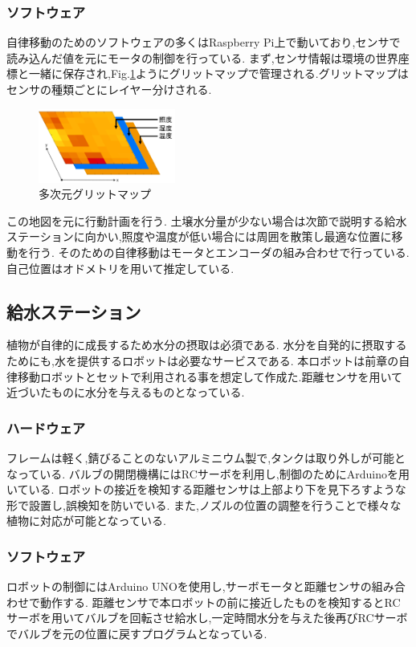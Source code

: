 \documentclass[10pt]{jsarticle}
\begin{document}
\subsubsection{ソフトウェア}
自律移動のためのソフトウェアの多くはRaspberry Pi上で動いており,センサで読み込んだ値を元にモータの制御を行っている.
まず,センサ情報は環境の世界座標と一緒に保存され,Fig.\ref{map}ようにグリットマップで管理される.グリットマップはセンサの種類ごとにレイヤー分けされる.
\begin{figure}[t]
    \centering
    \includegraphics[width=0.4\textwidth]{img/map_setumei.png}
    \caption{多次元グリットマップ}
    \label{map}
\end{figure}
この地図を元に行動計画を行う.
土壌水分量が少ない場合は次節で説明する給水ステーションに向かい,照度や温度が低い場合には周囲を散策し最適な位置に移動を行う.
そのための自律移動はモータとエンコーダの組み合わせで行っている.
自己位置はオドメトリを用いて推定している.

\subsection{給水ステーション}
植物が自律的に成長するため水分の摂取は必須である.
水分を自発的に摂取するためにも,水を提供するロボットは必要なサービスである.
本ロボットは前章の自律移動ロボットとセットで利用される事を想定して作成た.距離センサを用いて近づいたものに水分を与えるものとなっている.
\subsubsection{ハードウェア}
フレームは軽く,錆びることのないアルミニウム製で,タンクは取り外しが可能となっている.
バルブの開閉機構にはRCサーボを利用し,制御のためにArduinoを用いている.
ロボットの接近を検知する距離センサは上部より下を見下ろすような形で設置し,誤検知を防いでいる.
また,ノズルの位置の調整を行うことで様々な植物に対応が可能となっている.
\subsubsection{ソフトウェア}
ロボットの制御にはArduino UNOを使用し,サーボモータと距離センサの組み合わせで動作する.
距離センサで本ロボットの前に接近したものを検知するとRCサーボを用いてバルブを回転させ給水し,一定時間水分を与えた後再びRCサーボでバルブを元の位置に戻すプログラムとなっている.
\end{document}
